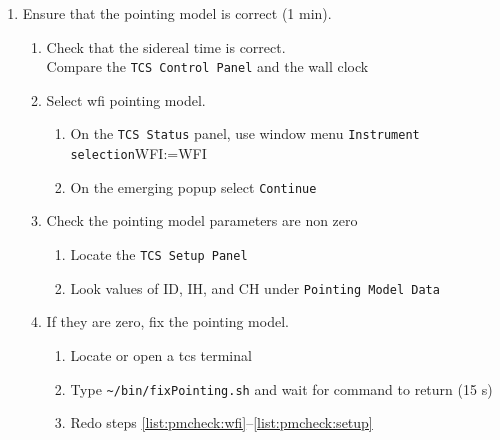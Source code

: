 \documentclass[11pt,fleqn]{book}
\makeatletter
\def\menu#1#2{\texttt{#1}\ifx{}#2\else\@for\@x:=#2\do{$\rightarrow$\texttt{\@x}}\fi}
\def\wmenu#1#2{window menu \menu{#1}{#2}}
\def\procref#1{Procedure~\ref{proc:#1}, p.~\pageref{proc:#1}}
\def\home{\textasciitilde{}}
\makeatother
\begin{document}
\begin{enumerate}
\begin{enumerate}
\begin{enumerate}
                \item If steps \ref{list:ccdstat}--\ref{list:skycatro} do not work, see \procref{fixwfiag}.
                \item On the \texttt{skycat} window, use \wmenu{TCS}{Pick reference star}
                \item On the window that appears, click \texttt{Cancel Operation}
          \end{enumerate}
          \item Ensure that the pointing model is correct (1 min).
          \begin{enumerate}
            \item Check that the sidereal time is correct.\\
                  Compare the \texttt{TCS Control Panel} and the wall clock
            \item\label{list:pmcheck:wfi} Select \gls{wfi} pointing model.
               \begin{enumerate}
                  \item On the \texttt{TCS Status} panel, use \wmenu{Instrument selection}{WFI}
                  \item On the emerging popup select \texttt{Continue}
               \end{enumerate}
            \item\label{list:pmcheck:setup} Check the pointing model parameters are non zero
               \begin{enumerate}
                  \item Locate the \texttt{TCS Setup Panel}
                  \item Look values of ID, IH, and CH under \texttt{Pointing Model Data}
               \end{enumerate} 
            \item If they are zero, fix the pointing model.
                \begin{enumerate}
                  \item Locate or open a tcs terminal 
                  \item Type \texttt{\home/bin/fixPointing.sh} and wait for command to return (15 s)
                  \item Redo steps \ref{list:pmcheck:wfi}--\ref{list:pmcheck:setup}
                \end{enumerate}
          \end{enumerate}
        \end{enumerate}

\end{enumerate}
\end{document}
